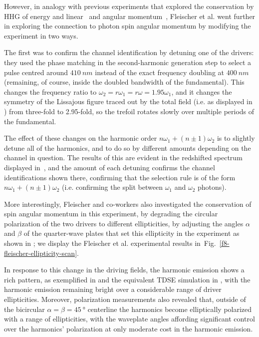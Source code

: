 However, in analogy with previous experiments that explored the conservation by HHG of energy \cite{EnergyConservationExperiment} and linear~\cite{ MomentumConservationExperiment} and angular momentum~\cite{ OAMConservationExperiment}, Fleischer et al. went further in exploring the connection to photon spin angular momentum by modifying the experiment in two ways.

The first was to confirm the channel identification by detuning one of the drivers: they used the phase matching in the second-harmonic generation step to select a pulse centred around $\SI{410}{nm}$ instead of the exact frequency doubling at $\SI{400}{nm}$ (remaining, of course, inside the doubled bandwidth of the fundamental). This changes the frequency ratio to $\omega_2=r\omega_1=r\omega=1.95\omega_1$, and it changes the symmetry of the Lissajous figure traced out by the total field (i.e. as displayed in ) from three-fold to 2.95-fold, so the trefoil rotates slowly over multiple periods of the fundamental. 

The effect of these changes on the harmonic order $n\omega_1+(n\pm 1)\omega_2$ is to slightly detune all of the harmonics, and to do so by different amounts depending on the channel in question. The results of this are evident in the redshifted spectrum displayed in~, and the amount of each detuning confirms the channel identifications shown there, confirming that the selection rule is of the form $n\omega_1+(n\pm 1)\omega_2$ (i.e. confirming the split between $\omega_1$ and $\omega_2$ photons).



More interestingly, Fleischer and co-workers also investigated the conservation of spin angular momentum in this experiment, by degrading the circular polarization of the two drivers to different ellipticities, by adjusting the angles $\alpha$ and $\beta$ of the quarter-wave plates that set this ellipticity in the experiment as shown in ; we display the Fleischer et al. experimental results in~Fig.~\ref{f8-fleischer-ellipticity-scan}.



In response to this change in the driving fields, the harmonic emission shows a rich pattern, as exemplified in  and the equivalent TDSE simulation in , with the harmonic emission remaining bright over a considerable range of driver ellipticities. Moreover, polarization measurements also revealed that, outside of the bicircular $\alpha=\beta=\SI{45}{\degree}$ centerline the harmonics become elliptically polarized with a range of ellipticities, with the waveplate angles affording significant control over the harmonics' polarization at only moderate cost in the harmonic emission.

